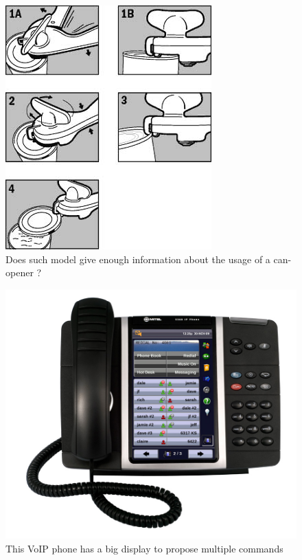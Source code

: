 \documentclass[a4paper,11pt] {article}
\theoremstyle{definition}
\begin{document}
 \begin{minipage}{\linewidth}
      \centering
      \begin{minipage}{0.45\linewidth}
          \begin{figure}[H]
          \centering
              \includegraphics[scale=0.4]{fig-report/can-opener}
              \caption{Does such model give enough information about the usage of a can-opener ?}
          \end{figure}
      \end{minipage}
      \hspace{0.05\linewidth}
      \begin{minipage}{0.45\linewidth}
          \begin{figure}[H]
                    \centering
               \includegraphics[scale=0.7]{fig-report/voip-phone.jpg}
              \caption{This VoIP phone has a big display to propose multiple commands}
          \end{figure}
      \end{minipage}
  \end{minipage}
\end{document}
